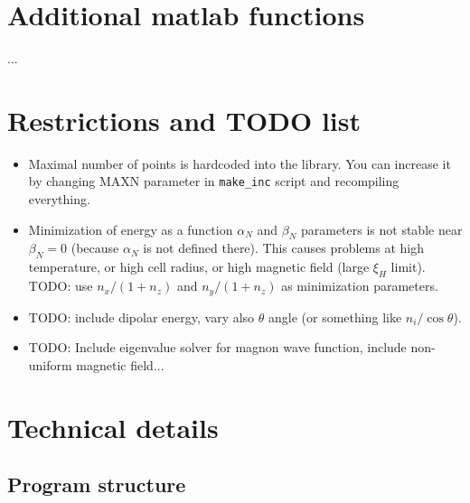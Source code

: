 \documentclass[a4paper]{article}
\begin{document}
\section*{Additional matlab functions}

...

\section*{Restrictions and TODO list}

\begin{itemize}

\item Maximal number of points is hardcoded into the library. You can
increase it by changing MAXN parameter in {\tt make\_inc} script and
recompiling everything.

\item Minimization of energy as a function $\alpha_N$ and $\beta_N$
parameters is not stable near $\beta_N=0$ (because $\alpha_N$ is not
defined there). This causes problems at high temperature, or high cell
radius, or high magnetic field (large $\xi_H$ limit). TODO: use
$n_x/(1+n_z)$ and $n_y/(1+n_z)$ as minimization parameters.

\item TODO: include dipolar energy, vary also $\theta$ angle (or
something like $n_i/\cos\theta$).

\item TODO: Include eigenvalue solver for magnon wave function,
include non-uniform magnetic field...

\end{itemize}

\section*{Technical details}

\subsection*{Program structure}
\end{document}
